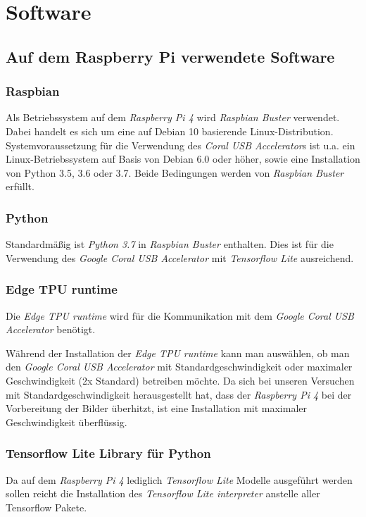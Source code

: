 \documentclass[a4paper, 12pt]{scrartcl}
\begin{document}
	\section{Software}
		\subsection{Auf dem Raspberry Pi verwendete Software}
			\subsubsection{Raspbian}
			Als Betriebssystem auf dem \emph{Raspberry Pi 4} wird \emph{Raspbian Buster} verwendet. Dabei handelt es sich um eine auf Debian 10 basierende Linux-Distribution. Systemvoraussetzung für die Verwendung des \emph{Coral USB Accelerator}s ist u.a. ein Linux-Betriebssystem auf Basis von Debian 6.0 oder höher, sowie eine Installation von Python 3.5, 3.6 oder 3.7. Beide Bedingungen werden von \emph{Raspbian Buster} erfüllt.
			
			
			
			\subsubsection{Python}
			Standardmäßig ist \emph{Python 3.7} in \emph{Raspbian Buster} enthalten. Dies ist für die Verwendung des \emph{Google Coral USB Accelerator} mit \emph{Tensorflow Lite} ausreichend.
			
			\subsubsection{Edge TPU runtime}
			Die \emph{Edge TPU runtime} wird für die Kommunikation mit dem \emph{Google Coral USB Accelerator} benötigt.
			
			Während der Installation der \emph{Edge TPU runtime} kann man auswählen, ob man den \emph{Google Coral USB Accelerator} mit Standardgeschwindigkeit oder maximaler Geschwindigkeit (2x Standard) betreiben möchte. Da sich bei unseren Versuchen mit Standardgeschwindigkeit herausgestellt hat, dass der \emph{Raspberry Pi 4} bei der Vorbereitung der Bilder überhitzt, ist eine Installation mit maximaler Geschwindigkeit überflüssig.
			
			\subsubsection{Tensorflow Lite Library für Python}
			Da auf dem \emph{Raspberry Pi 4} lediglich \emph{Tensorflow Lite} Modelle ausgeführt werden sollen reicht die Installation des \emph{Tensorflow Lite interpreter} anstelle aller Tensorflow Pakete.
			
\end{document}
